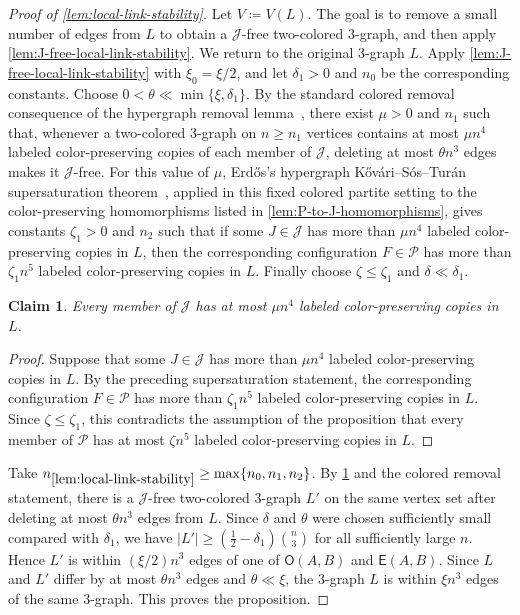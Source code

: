 \documentclass[10pt,a4paper]{article}
\theoremstyle{plain}
\newtheorem{claim}[claim]{Claim}
\theoremstyle{definition}
\begin{document}
\begin{proof}[Proof of \cref{lem:local-link-stability}]
Let $V\coloneqq V(L)$.
The goal is to remove a small number of edges from $L$ to obtain a $\mathcal J$-free two-colored $3$-graph, and then apply \cref{lem:J-free-local-link-stability}.
We return to the original $3$-graph $L$. Apply \cref{lem:J-free-local-link-stability} with $\xi_0=\xi/2$, and let $\delta_1>0$ and $n_0$ be the corresponding constants. Choose $0<\theta\ll\min\{\xi,\delta_1\}$.
By the standard colored removal consequence of the hypergraph removal lemma~\cite{RS09}, there exist $\mu>0$ and $n_1$ such that, whenever a two-colored $3$-graph on $n\ge n_1$ vertices contains at most $\mu n^4$ labeled color-preserving copies of each member of $\mathcal J$, deleting at most $\theta n^3$ edges makes it $\mathcal J$-free.
For this value of $\mu$, Erd\H{o}s's hypergraph K\H{o}v\'ari--S\'os--Tur\'an supersaturation theorem~\cite{Erdos67a}, applied in this fixed colored partite setting to the color-preserving homomorphisms listed in \cref{lem:P-to-J-homomorphisms}, gives constants $\zeta_1>0$ and $n_2$ such that if some $J\in\mathcal J$ has more than $\mu n^4$ labeled color-preserving copies in $L$, then the corresponding configuration $F\in\mathcal P$ has more than $\zeta_1n^5$ labeled color-preserving copies in $L$.
Finally choose $\zeta\le\zeta_1$ and $\delta\ll\delta_1$.

\begin{claim}\label{clm:few-J-copies}
Every member of $\mathcal J$ has at most $\mu n^4$ labeled color-preserving copies in $L$.
\end{claim}

\begin{proof}
Suppose that some $J\in\mathcal J$ has more than $\mu n^4$ labeled color-preserving copies in $L$.
By the preceding supersaturation statement, the corresponding configuration $F\in\mathcal P$ has more than $\zeta_1n^5$ labeled color-preserving copies in $L$.
Since $\zeta\le\zeta_1$, this contradicts the assumption of the proposition that every member of $\mathcal P$ has at most $\zeta n^5$ labeled color-preserving copies in $L$.
\end{proof}

Take $n_{\ref{lem:local-link-stability}}\ge\max\{n_0,n_1,n_2\}$.
By \cref{clm:few-J-copies} and the colored removal statement, there is a $\mathcal J$-free two-colored $3$-graph $L'$ on the same vertex set after deleting at most $\theta n^3$ edges from $L$.
Since $\delta$ and $\theta$ were chosen sufficiently small compared with $\delta_1$, we have $|L'|\ge \left(\frac12-\delta_1\right)\binom n3$ for all sufficiently large $n$. Hence $L'$ is within $(\xi/2)n^3$ edges of one of $\mathsf O(A,B)$ and $\mathsf E(A,B)$. Since $L$ and $L'$ differ by at most $\theta n^3$ edges and $\theta\ll\xi$, the $3$-graph $L$ is within $\xi n^3$ edges of the same $3$-graph. This proves the proposition.
\end{proof}
\end{document}
